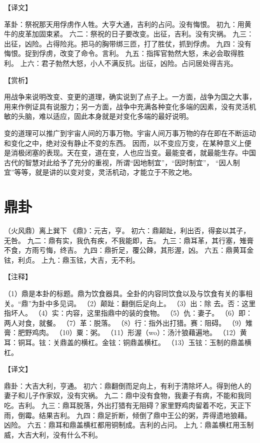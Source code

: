 \documentclass[a4paper,12pt,UTF8,twoside]{ctexbook}
\begin{document}
【译文】

革卦：祭祝那天用俘虏作人牲。大亨大通，吉利的占问。没有悔恨。
初九：用黄牛的皮革加固束紧。
六二：祭祝的日子要改变。出征，吉利。没有灾祸。
九三：出征，凶险。占得险兆。把马的胸带绑三匝，打了胜仗，抓到俘虏。
九四：没有悔恨。捉到俘虏，改变了命令。言利。
九五：指挥官勃然大怒，未必会取得胜利。
上六：君子勃然大怒，小人不满反抗。出征，凶险。占问居处得吉兆。

【赏析】

用战争来说明改变、变更的道理，确实说到了点子上。一方面，战争为国之大事，用来作例证具有说服力；另一方面，战争中充满各种变化多端的因素，没有灵活机敏的头脑，难以适应，固此本身就是对变化多端的最好说明。

变的道理可以推广到宇宙人间的万事万物。宇宙人间万事万物的存在即在不断运动和变化之中，绝对没有静止不变的东西。 因而，以不变应万变，在某种意义上便是消极闭塞的表现。天在变，道在变，人也应当变。最能变者，就最能生存。中国古代的智慧对此给予了充分的重视，所谓“因地制宜”，“因时制宜”， “因人制宜”等等，就是讲的以变对变，灵活机动，才能立于不败之地。

\chapter{鼎卦}

（火风鼎）离上巽下
《鼎》：元吉，亨。
初六：鼎颠趾，利出否，得妾以其子，无咎。
九二：鼎有实，我仇有疾，不我能即，吉。
九三：鼎耳革，其行塞，雉膏不食，方雨亏悔，终吉。
九四：鼎折足，覆公餗，其形渥，凶。
六五：鼎黄耳金铉，利贞。
上九：鼎玉铉，大吉，无不利。

【注释】

（1）鼎是本卦的标题。鼎为饮食器具。全卦的内容同饮食以及与饮食有关的事相关。“鼎”为卦中多见词。
（2）颠趾：翻倒后足向上。
（3）出：除 去。否：这里指坏人。
（4）实：内容，这里指鼎中的装的食物。
（5）仇：妻子。
（6）即：两人对食，就餐。
（7）革：脱落。
（8）行：指外出打猎。赛：阻碍。
（9）雉膏：肥野鸡肉。
（10）粟：粥。
（11）形渥（wo）：汤汁狼藉遍地。
（12）黄耳：铜耳。铉：关鼎盖的横杠。金铉：铜鼎盖横杠。
（13）玉铉：玉制的鼎盖横杠。

【译文】

鼎卦：大吉大利，亨通。
初六：鼎翻倒而足向上，有利于清除坏人。得到他人的妻子和儿子作家奴，没有灾祸。
九二：鼎中没有食物，我妻子有病，不能和我同吃。吉利。
九三：鼎耳脱落，外出打猎有无阻碍？家里野鸡肉留着不吃，天正下雨，倒霉。结果吉利。
九四：鼎足折断，倾倒了鼎中王公的粥，弄得遗地狼藉。凶险。
六五：鼎耳和鼎盖横杠都用铜制成。吉利的占问。
上九：鼎盖横杠用玉制威，大吉大利，没有什么不利。
\end{document}
